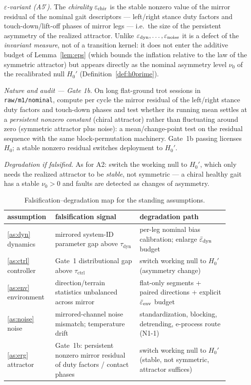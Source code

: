 \emph{$\varepsilon$-variant (A5$'$).} The \emph{chirality} $\varepsilon_{\mathrm{chir}}$ is
the stable nonzero value of the mirror residual of the nominal gait
descriptors --- left/right stance duty factors and touch-down/lift-off phases
of mirror legs --- i.e.\ the size of the persistent asymmetry of the realized
attractor. Unlike $\varepsilon_{\mathrm{dyn}}, \dots, \varepsilon_{\mathrm{noise}}$ it is a defect of the
\emph{invariant measure}, not of a transition kernel: it does not enter the
additive budget of Lemma~\ref{lem:eps} (which bounds the inflation relative
to the law of the symmetric attractor) but appears directly as the nominal
asymmetry level $\nu_0$ of the recalibrated null $H_0'$
(Definition~\ref{def:h0prime}).

\emph{Nature and audit --- Gate 1b.} On long flat-ground trot sessions in
\texttt{raw/m1/nominal}, compute per cycle the mirror residual of the
left/right stance duty factors and touch-down phases and test whether its
running mean settles at a \emph{persistent nonzero constant} (chiral
attractor) rather than fluctuating around zero (symmetric attractor plus
noise): a mean/change-point test on the residual sequence with the same
block-permutation machinery. Gate~1b passing licenses $H_0$; a stable
nonzero residual switches deployment to $H_0'$.

\emph{Degradation if falsified.} As for A2: switch the working null to
$H_0'$, which only needs the realized attractor to be \emph{stable}, not
symmetric --- a chiral healthy gait has a stable $\nu_0 > 0$ and faults are
detected as changes of asymmetry.

\begin{table}[ht]
\centering
\small
\begin{tabular}{@{}p{0.16\linewidth}p{0.36\linewidth}p{0.38\linewidth}@{}}
\toprule
assumption & falsification signal & degradation path \\
\midrule
\ref{as:dyn} dynamics &
mirrored system-ID parameter gap above $\tau_{\mathrm{dyn}}$ &
per-leg nominal bias calibration; enlarge $\bar\varepsilon_{\mathrm{dyn}}$ budget \\
\ref{as:ctrl} controller &
Gate~1 distributional gap above $\tau_{\mathrm{ctrl}}$ &
switch working null to $H_0'$ (asymmetry change) \\
\ref{as:env} environment &
direction/terrain statistics unbalanced across mirror &
flat-only segments + paired directions + explicit $\bar\varepsilon_{\mathrm{env}}$ budget \\
\ref{as:noise} noise &
mirrored-channel noise mismatch; temperature drift &
standardization, blocking, detrending, e-process route (N1-1) \\
\ref{as:erg} attractor &
Gate~1b: persistent nonzero mirror residual of duty factors / contact phases &
switch working null to $H_0'$ (stable, not symmetric, attractor suffices) \\
\bottomrule
\end{tabular}
\caption{Falsification--degradation map for the standing assumptions.}
\label{tab:degradation}
\end{table}

